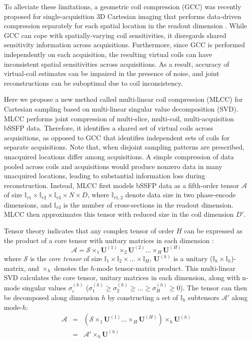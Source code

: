 \documentclass[11pt, onecolumn]{article}
\begin{document}
To alleviate these limitations, a geometric coil compression (GCC) was recently proposed for single-acquisition 3D Cartesian imaging that performs data-driven compression separately for each spatial location in the readout dimension \cite{Zhang:2013df}. While GCC can cope with spatially-varying coil sensitivities, it disregards shared sensitivity information across acquisitions. Furthermore, since GCC is performed independently on each acquisition, the resulting virtual coils can have inconsistent spatial sensitivities across acquisitions. As a result, accuracy of virtual-coil estimates can be impaired in the presence of noise, and joint reconstructions can be suboptimal due to coil inconsistency. 

Here we propose a new method called multi-linear coil compression (MLCC) for Cartesian sampling based on multi-linear singular value decomposition (SVD). MLCC performs joint compression of multi-slice, multi-coil, multi-acquisition bSSFP data. Therefore, it identifies a shared set of virtual coils across acquisitions, as opposed to GCC that identifies independent sets of coils for separate acquisitions. Note that, when disjoint sampling patterns are prescribed, unacquired locations differ among acquisitions. A simple compression of data pooled across coils and acquisitions would produce nonzero data in many unacquired locations, leading to substantial information loss during reconstruction. Instead, MLCC first models bSSFP data as a fifth-order tensor $\mathcal{A}$ of size $\mathbb{I}_{r1}\!\times\!\mathbb{I}_{r2}\!\times\!\mathbb{I}_{r3}\!\times\!N\!\times\!D$, where $\mathbb{I}_{r1,2}$ denote data size in two phase-encode dimensions, and $\mathbb{I}_{r3}$ is the number of cross-sections in the readout dimension. MLCC then approximates this tensor with reduced size in the coil dimension $D'$.

Tensor theory indicates that any complex tensor of order $H$ can be expressed as the product of a core tensor with unitary matrices in each dimension \cite{de2000multilinear}:
\begin{equation}
\label{eq:mlsvd_theorem}
\mathcal{A}=\mathcal{S}\!\times_1\!\mathbf{U}^{(1)}\!\times_2\!\mathbf{U}^{(2)}\dots\!\times_H\!\mathbf{U}^{(H)}
\end{equation}
where $\mathcal{S}$ is the \textit{core tensor} of size $\mathbb{I}_{1}\!\times\mathbb{I}_2\!\times\dots\times\mathbb{I}_H\!$, $\mathbf{U}^{(h)}$ is a unitary ($\mathbb{I}_h\!\times\mathbb{I}_h$)-matrix, and $\times_h$ denotes the $h$-mode tensor-matrix product. This multi-linear SVD calculates the core tensor, unitary matrices in each dimension, along with n-mode singular values $\sigma_i^{(h)}$ ($\sigma_1^{(h)} \geqslant \sigma_2^{(h)} \geqslant \dots \geqslant \sigma_H^{(h)} \geqslant 0$). The tensor can then be decomposed along dimension $h$ by constructing a set of $\mathbb{I}_h$ subtensors $\mathcal{A}'$ along mode-$h$:
\begin{eqnarray}
 \mathcal{A} &=& (\mathcal{S}\!\times_1\!\mathbf{U}^{(1)}\dots\!\times_H\!\mathbf{U}^{(H)}) \!\times_h\!\mathbf{U}^{(h)} \\ \nonumber
&=& \mathcal{A}' \!\times_h\!\mathbf{U}^{(h)} 
\end{eqnarray} 
\end{document}
